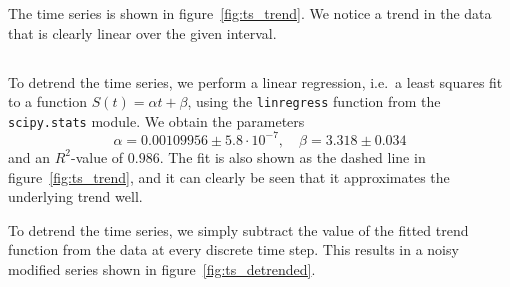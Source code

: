 \documentclass[a4paper,DIV=12,english]{scrartcl}
\begin{document}
The time series is shown in figure~\ref{fig:ts_trend}. We notice a trend in the data that is clearly linear over the given interval.

\subsection{}
To detrend the time series, we perform a linear regression, i.e.\ a least squares fit to a function $S(t)=\alpha t + \beta $, using the \texttt{linregress} function from the \texttt{scipy.stats} module. We obtain the parameters
\begin{equation*}
    \alpha = 0.00109956 \pm 5.8\cdot 10^{-7}, \quad \beta = 3.318 \pm 0.034
\end{equation*}
and an $R^2$-value of $0.986$. The fit is also shown as the dashed line in figure~\ref{fig:ts_trend}, and it can clearly be seen that it approximates the underlying trend well.

To detrend the time series, we simply subtract the value of the fitted trend function from the data at every discrete time step. This results in a noisy modified series shown in figure~\ref{fig:ts_detrended}.
\end{document}

